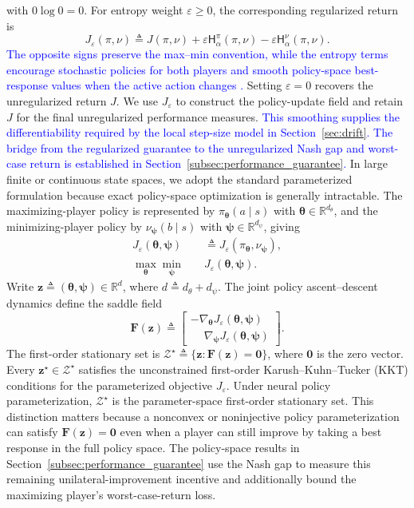 \documentclass[journal]{IEEEtran}
\theoremstyle{remark}
\newcommand{\R}{\mathbb{R}}
\newcommand{\bz}{\boldsymbol{z}}
\newcommand{\btheta}{\boldsymbol{\theta}}
\newcommand{\bpsi}{\boldsymbol{\psi}}
\newcommand{\bzero}{\boldsymbol{0}}
\newcommand{\bF}{\boldsymbol{F}}
\begin{document}
	with $0\log0=0$.
	For entropy weight $\varepsilon\ge0$, the corresponding regularized return is
	\begin{equation}\label{eq:entropic_return}
		J_{\varepsilon}(\pi,\nu)
		\triangleq J(\pi,\nu)
		+\varepsilon\mathsf H_{\alpha}^{\pi}(\pi,\nu)
		-\varepsilon\mathsf H_{\alpha}^{\nu}(\pi,\nu).
	\end{equation}
	\textcolor{blue}{The opposite signs preserve the max--min convention, while the entropy terms encourage stochastic policies for both players and smooth policy-space best-response values when the active action changes \cite{CenWeiChi2024FastPolicyEG}.}
	Setting $\varepsilon=0$ recovers the unregularized return $J$.
	We use $J_\varepsilon$ to construct the policy-update field and retain $J$ for the final unregularized performance measures.
	\textcolor{blue}{This smoothing supplies the differentiability required by the local step-size model in Section~\ref{sec:drift}.}
	\textcolor{blue}{The bridge from the regularized guarantee to the unregularized Nash gap and worst-case return is established in Section~\ref{subsec:performance_guarantee}.}
	In large finite or continuous state spaces, we adopt the standard parameterized formulation because exact policy-space optimization is generally intractable.
	The maximizing-player policy is represented by $\pi_{\btheta}(a\mid s)$ with $\btheta\in\R^{d_{\theta}}$, and the minimizing-player policy by $\nu_{\bpsi}(b\mid s)$ with $\bpsi\in\R^{d_{\psi}}$, giving
	\[
	\begin{aligned}
		J_{\varepsilon}(\btheta,\bpsi)
		&\triangleq
		J_{\varepsilon}(\pi_{\btheta},\nu_{\bpsi}),\\
		\max_{\btheta}\min_{\bpsi}\quad
		&J_{\varepsilon}(\btheta,\bpsi).
	\end{aligned}
	\]
	Write $\bz\triangleq(\btheta,\bpsi)\in\R^d$, where $d\triangleq d_\theta+d_\psi$.
	The joint policy ascent--descent dynamics define the saddle field
	\begin{equation}\label{eq:Fdef}
		\bF(\bz)
		\triangleq
		\begin{bmatrix}
			-\nabla_{\btheta}J_{\varepsilon}(\btheta,\bpsi)\\[0.2em]
			\phantom{-}\nabla_{\bpsi}J_{\varepsilon}(\btheta,\bpsi)
		\end{bmatrix}.
	\end{equation}
	The first-order stationary set is $\mathcal Z^{\star}\triangleq\{\bz:\bF(\bz)=\bzero\}$, where $\bzero$ is the zero vector.
	Every $\bz^\star\in\mathcal Z^\star$ satisfies the unconstrained first-order Karush--Kuhn--Tucker (KKT) conditions for the parameterized objective $J_\varepsilon$.
	Under neural policy parameterization, $\mathcal Z^\star$ is the parameter-space first-order stationary set.
	This distinction matters because a nonconvex or noninjective policy parameterization can satisfy $\bF(\bz)=\bzero$ even when a player can still improve by taking a best response in the full policy space.
	The policy-space results in Section~\ref{subsec:performance_guarantee} use the Nash gap to measure this remaining unilateral-improvement incentive and additionally bound the maximizing player's worst-case-return loss.
	
\end{document}
